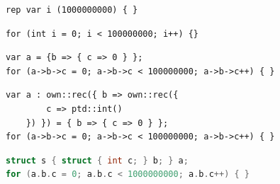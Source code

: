 \documentclass[licencjacka]{pracamgr}
\begin{document}
\begin{minipage}{\linewidth}
\begin{lstlisting}[caption={Iterator całkowitoliczbowy NL},label={lst:int_loop_nl},language=nl]
rep var i (1000000000) { }
\end{lstlisting}
\begin{lstlisting}[caption={Iterator całkowitoliczbowy C},label={lst:int_loop_c},language=nl]
for (int i = 0; i < 100000000; i++) {}
\end{lstlisting}
\begin{lstlisting}[caption={Iterator będący polem rekordu NL \texttt{ptd}},label={lst:rec_loop_ptd},language=nl]
var a = {b => { c => 0 } };
for (a->b->c = 0; a->b->c < 100000000; a->b->c++) { }
\end{lstlisting}
\begin{lstlisting}[caption={Iterator będący polem rekordu NL \texttt{own}},label={lst:rec_loop_own},language=nl]
var a : own::rec({ b => own::rec({
		c => ptd::int()
	}) }) = { b => { c => 0 } };
for (a->b->c = 0; a->b->c < 100000000; a->b->c++) { }
\end{lstlisting}
\begin{lstlisting}[caption={Iterator będący polem rekordu C},label={lst:rec_loop_c},language=C]
struct s { struct { int c; } b; } a;
for (a.b.c = 0; a.b.c < 1000000000; a.b.c++) { }
\end{lstlisting}
\end{minipage}
\end{document}
